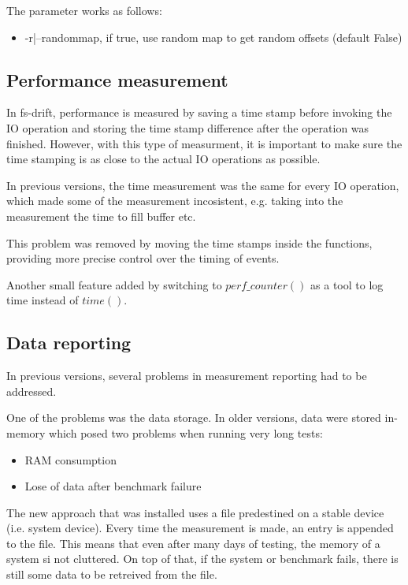 \documentclass[
  color, %
  table, %
  lof,   %
  lot,   %
]{fithesis3}
\begin{document}
The parameter works as follows:
\begin{itemize}
    \item -r|--randommap, if true, use random map to get random offsets (default False)
\end{itemize}


\subsection{Performance measurement}
In fs-drift, performance is measured by saving a time stamp before invoking the IO operation and storing the time stamp difference after the operation was finished. However, with this type of measurment, it is important to make sure the time stamping is as close to the actual IO operations as possible. 

In previous versions, the time measurement was the same for every IO operation, which made some of the measurement incosistent, e.g. taking into the measurement the time to fill buffer etc.

This problem was removed by moving the time stamps inside the functions, providing more precise control over the timing of events.

Another small feature added by switching to $perf\_counter()$ as a tool to log time instead of $time()$.


\subsection{Data reporting}
In previous versions, several problems in measurement reporting had to be addressed.

One of the problems was the data storage. In older versions, data were stored in-memory which posed two problems when running very long tests:
\begin{itemize}
    \item RAM consumption
    \item Lose of data after benchmark failure
\end{itemize}

The new approach that was installed uses a file predestined on a stable device (i.e. system device). Every time the measurement is made, an entry is appended to the file. This means that even after many days of testing, the memory of a system si not cluttered. On top of that, if the system or benchmark fails, there is still some data to be retreived from the file.
\end{document}
